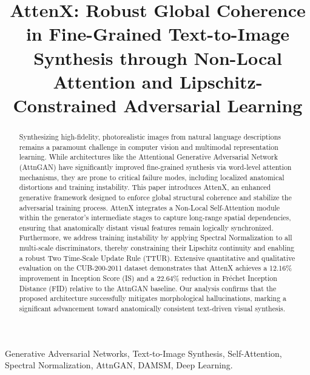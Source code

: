 \documentclass[conference]{IEEEtran}
\begin{document}
\title{AttenX: Robust Global Coherence in Fine-Grained Text-to-Image Synthesis through Non-Local Attention and Lipschitz-Constrained Adversarial Learning}

\author{
}

\maketitle

\begin{abstract}
Synthesizing high-fidelity, photorealistic images from natural language descriptions remains a paramount challenge in computer vision and multimodal representation learning. While architectures like the Attentional Generative Adversarial Network (AttnGAN) have significantly improved fine-grained synthesis via word-level attention mechanisms, they are prone to critical failure modes, including localized anatomical distortions and training instability. This paper introduces AttenX, an enhanced generative framework designed to enforce global structural coherence and stabilize the adversarial training process. AttenX integrates a Non-Local Self-Attention module within the generator's intermediate stages to capture long-range spatial dependencies, ensuring that anatomically distant visual features remain logically synchronized. Furthermore, we address training instability by applying Spectral Normalization to all multi-scale discriminators, thereby constraining their Lipschitz continuity and enabling a robust Two Time-Scale Update Rule (TTUR). Extensive quantitative and qualitative evaluation on the CUB-200-2011 dataset demonstrates that AttenX achieves a 12.16\% improvement in Inception Score (IS) and a 22.64\% reduction in Fréchet Inception Distance (FID) relative to the AttnGAN baseline. Our analysis confirms that the proposed architecture successfully mitigates morphological hallucinations, marking a significant advancement toward anatomically consistent text-driven visual synthesis.
\end{abstract}

\begin{IEEEkeywords}
Generative Adversarial Networks, Text-to-Image Synthesis, Self-Attention, Spectral Normalization, AttnGAN, DAMSM, Deep Learning.
\end{IEEEkeywords}
\end{document}
